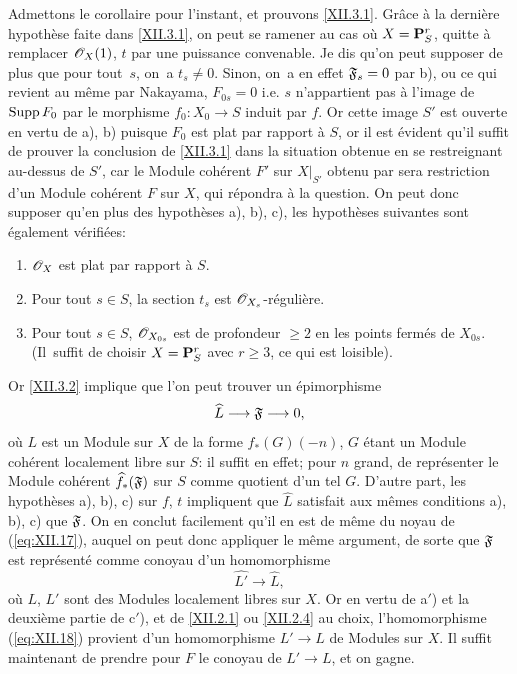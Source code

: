 Admettons le corollaire pour l'instant, et prouvons \ref{XII.3.1}. Gr\^ace \`a la derni\`ere hypoth\`ese faite dans \ref{XII.3.1}, on peut se ramener au cas o\`u $X={\mathbf P}^r_S$, quitte \`a remplacer $\mathscr{O}_X(1)$, $t$ par une puissance convenable. Je dis qu'on peut supposer de plus que pour tout~$s$, on~a $t_s\neq 0$. Sinon, on~a en effet $\mathfrak{F}_s=0$ par b), ou ce qui revient au m\^eme par Nakayama, $F_{0s}=0$ i.e. $s$ n'appartient pas \`a l'image de $\operatorname{Supp} F_0$ par le morphisme $f_0:X_0\to S$ induit par $f$. Or cette image $S'$ est ouverte en vertu de a), b) puisque $F_0$ est plat par rapport \`a $S$, or il est \'evident qu'il suffit de prouver la conclusion de \ref{XII.3.1} dans la situation obtenue en se restreignant au-dessus de $S'$, car le Module coh\'erent $F'$ sur $X|_{S'}$ obtenu par sera restriction d'un Module coh\'erent $F$ sur $X$, qui r\'epondra \`a la question. On peut donc supposer qu'en plus des hypoth\`eses a), b), c), les hypoth\`eses suivantes sont \'egalement v\'erifi\'ees:
\begin{enumerate}
\item[\textup{a$'$)}] $\mathscr{O}_X$ est plat par rapport \`a $S$.
\item[\textup{b$'$)}] Pour tout $s\in S$, la section $t_s$ est ${\mathscr O}_{X_s}$-r\'eguli\`ere.
\item[\textup{c$'$)}] Pour tout $s\in S$, ${\mathscr O}_{X_{0s}}$ est de profondeur $\geq 2$ en les points ferm\'es de $X_{0s}$. (Il~suffit de choisir $X={\mathbf P}_S^r$ avec $r\geq 3$, ce qui est loisible).
\end{enumerate}
Or \ref{XII.3.2} implique que l'on peut trouver un \'epimorphisme
\steco
\begin{equation} \label{eq:XII.17}
\widehat{L} \to \formelF \to 0,
\end{equation}
o\`u $L$ est un Module sur $X$ de la forme $f_\ast(G)(-n)$, $G$ \'etant un Module coh\'erent localement libre sur $S$: il suffit en effet; pour $n$ grand, de repr\'esenter le Module coh\'erent $\widehat{f}_\ast(\mathfrak{F})$ sur $S$ comme quotient d'un tel $G$. D'autre part, les hypoth\`eses a), b), c) sur $f$, $t$ impliquent que $\widehat{L}$ satisfait aux m\^emes conditions a), b), c) que $\mathfrak{F}$. On en conclut facilement qu'il en est de m\^eme du noyau de (\ref{eq:XII.17}), auquel on peut donc appliquer le m\^eme argument, de sorte que $\mathfrak{F}$ est repr\'esent\'e comme conoyau d'un homomorphisme
\steco
\begin{equation} \label{eq:XII.18}
\widehat{L'} \to \widehat{L},
\end{equation}
o\`u $L$, $L'$ sont des Modules localement libres sur $X$. Or en vertu de a$'$) et la deuxi\`eme partie de c$'$), et de \ref{XII.2.1} ou \ref{XII.2.4} au choix, l'homomorphisme (\ref{eq:XII.18}) provient d'un homomorphisme $L'\to L$ de Modules sur $X$. Il suffit maintenant de prendre pour $F$ le conoyau de $L'\to L$, et on gagne.

